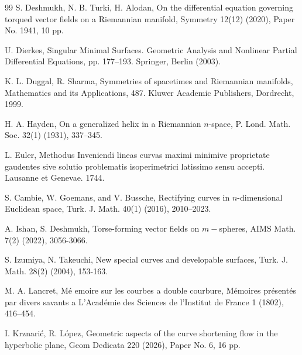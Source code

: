 \documentclass[12pt]{amsart}
\theoremstyle{definition}
\begin{document}
\begin{thebibliography}{99}
 S. Deshmukh, N. B. Turki, H. Alodan, On the differential equation governing torqued vector fields on a Riemannian manifold, Symmetry 12(12) (2020), Paper No. 1941, 10 pp.

 U. Dierkes, Singular Minimal Surfaces. Geometric Analysis and Nonlinear Partial Differential
Equations, pp. 177–193. Springer, Berlin (2003).

 K. L. Duggal, R. Sharma, Symmetries of spacetimes and Riemannian manifolds, Mathematics and its Applications, 487. Kluwer
Academic Publishers, Dordrecht, 1999.


 H. A. Hayden, On a generalized helix in a Riemannian $n$-space, P. Lond. Math. Soc. 32(1) (1931), 337–345.

 L. Euler, Methodus Inveniendi lineas curvas maximi minimive proprietate gaudentes sive
solutio problematis isoperimetrici latissimo sensu accepti. Lausanne et Genevae. 1744.


 S. Cambie, W. Goemans, and V. Bussche, Rectifying curves in $n$-dimensional Euclidean space,
Turk. J. Math. 40(1) (2016), 2010–2023.



  A. Ishan, S. Deshmukh, Torse-forming vector fields on $m-$spheres, AIMS Math. 7(2) (2022), 3056-3066.

  S. Izumiya, N. Takeuchi, New special curves and developable surfaces, Turk. J. Math. 28(2)
(2004), 153-163.

   M. A. Lancret, M\'e emoire sur les courbes a double courbure, M\'emoires pr\'esent\'es par divers savants a L’Acad\'emie des Sciences de l’Institut de France 1 (1802), 416–454.

 I. Krznari\'c, R. L\'opez, Geometric aspects of the curve shortening flow in the hyperbolic plane, Geom Dedicata 220 (2026), Paper No. 6, 16 pp.


\end{thebibliography}
\end{document}
